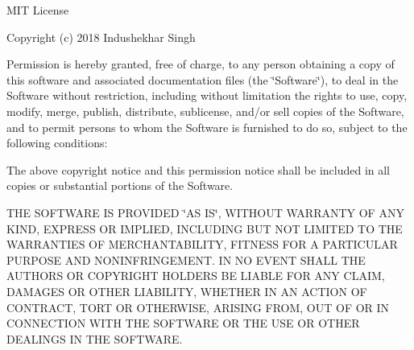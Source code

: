 M\+IT License

Copyright (c) 2018 Indushekhar Singh

Permission is hereby granted, free of charge, to any person obtaining a copy of this software and associated documentation files (the \char`\"{}\+Software\char`\"{}), to deal in the Software without restriction, including without limitation the rights to use, copy, modify, merge, publish, distribute, sublicense, and/or sell copies of the Software, and to permit persons to whom the Software is furnished to do so, subject to the following conditions\+:

The above copyright notice and this permission notice shall be included in all copies or substantial portions of the Software.

T\+HE S\+O\+F\+T\+W\+A\+RE IS P\+R\+O\+V\+I\+D\+ED \char`\"{}\+A\+S I\+S\char`\"{}, W\+I\+T\+H\+O\+UT W\+A\+R\+R\+A\+N\+TY OF A\+NY K\+I\+ND, E\+X\+P\+R\+E\+SS OR I\+M\+P\+L\+I\+ED, I\+N\+C\+L\+U\+D\+I\+NG B\+UT N\+OT L\+I\+M\+I\+T\+ED TO T\+HE W\+A\+R\+R\+A\+N\+T\+I\+ES OF M\+E\+R\+C\+H\+A\+N\+T\+A\+B\+I\+L\+I\+TY, F\+I\+T\+N\+E\+SS F\+OR A P\+A\+R\+T\+I\+C\+U\+L\+AR P\+U\+R\+P\+O\+SE A\+ND N\+O\+N\+I\+N\+F\+R\+I\+N\+G\+E\+M\+E\+NT. IN NO E\+V\+E\+NT S\+H\+A\+LL T\+HE A\+U\+T\+H\+O\+RS OR C\+O\+P\+Y\+R\+I\+G\+HT H\+O\+L\+D\+E\+RS BE L\+I\+A\+B\+LE F\+OR A\+NY C\+L\+A\+IM, D\+A\+M\+A\+G\+ES OR O\+T\+H\+ER L\+I\+A\+B\+I\+L\+I\+TY, W\+H\+E\+T\+H\+ER IN AN A\+C\+T\+I\+ON OF C\+O\+N\+T\+R\+A\+CT, T\+O\+RT OR O\+T\+H\+E\+R\+W\+I\+SE, A\+R\+I\+S\+I\+NG F\+R\+OM, O\+UT OF OR IN C\+O\+N\+N\+E\+C\+T\+I\+ON W\+I\+TH T\+HE S\+O\+F\+T\+W\+A\+RE OR T\+HE U\+SE OR O\+T\+H\+ER D\+E\+A\+L\+I\+N\+GS IN T\+HE S\+O\+F\+T\+W\+A\+RE. 